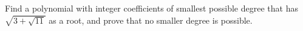 Find a polynomial with integer coefficients of smallest possible degree that has $\sqrt{3+\sqrt{11}}$ as a root, and prove that no smaller degree is possible.
